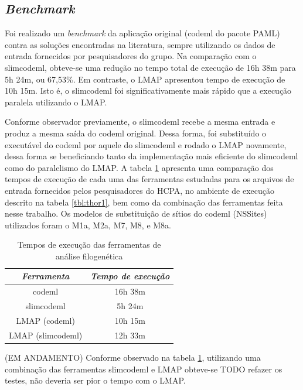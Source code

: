 \documentclass[cic,tc]{iiufrgs}
\begin{document}
{\subsection{\textit{Benchmark}}

Foi realizado um \textit{benchmark} da aplicação original (codeml do pacote PAML) contra
as soluções encontradas na literatura, sempre utilizando os dados de entrada
fornecidos por pesquisadores do grupo. Na comparação com o slimcodeml,
obteve-se uma redução no tempo total de execução de 16h 38m para 5h 24m, ou
67,53\%. Em contraste, o LMAP apresentou tempo de execução de 10h 15m. Isto é,
o slimcodeml foi significativamente mais rápido que a execução paralela
utilizando o LMAP.

Conforme observador previamente, o slimcodeml recebe a mesma entrada e produz a
mesma saída do codeml original. Dessa forma, foi substituído o executável do
codeml por aquele do slimcodeml e rodado o LMAP novamente, dessa forma se
beneficiando tanto da implementação mais eficiente do slimcodeml como do
paralelismo do LMAP. A tabela \ref{tbl:paml} apresenta uma comparação dos
tempos de execução de cada uma das ferramentas estudadas para os arquivos de
entrada fornecidos pelos pesquisadores do HCPA, no ambiente de execução
descrito na tabela \ref{tbl:thor1}, bem como da combinação das ferramentas
feita nesse trabalho. Os modelos de substituição de sítios do codeml (NSSites)
utilizados foram o M1a, M2a, M7, M8, e M8a.

\begin{table}[h]
    \caption{Tempos de execução das ferramentas de análise filogenética}
    \centering
        \begin{tabular}{c|c}
          \hline
          \textit{Ferramenta}  &   \textit{Tempo de execução} \\
          \hline
          \hline
          codeml & 16h 38m \\
          slimcodeml & 5h 24m \\
          LMAP (codeml) & 10h 15m \\
          LMAP (slimcodeml) & 12h 33m \\
          \hline
        \end{tabular}
    \label{tbl:paml}
\end{table}

(EM ANDAMENTO) Conforme observado na tabela \ref{tbl:paml}, utilizando uma combinação das
ferramentas slimcodeml e LMAP obteve-se TODO refazer os testes, não deveria
ser pior o tempo com o LMAP.

}
\end{document}
